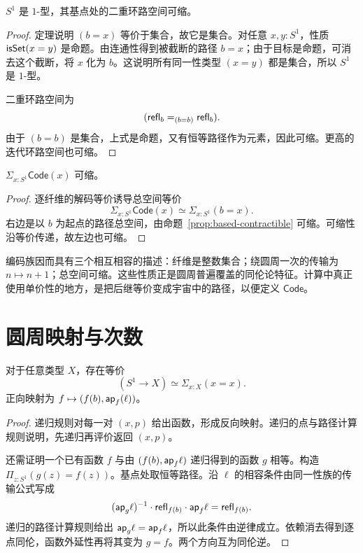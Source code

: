 \begin{proposition}[圆周的高阶路径]
$S^1$ 是 $1$-型，其基点处的二重环路空间可缩。
\end{proposition}
\begin{proof}
定理说明 $(b=x)$ 等价于集合，故它是集合。对任意 $x,y:S^1$，性质 $\mathsf{isSet}(x=y)$ 是命题。由连通性得到被截断的路径 $b=x$；由于目标是命题，可消去这个截断，将 $x$ 化为 $b$。这说明所有同一性类型 $(x=y)$ 都是集合，所以 $S^1$ 是 $1$-型。

二重环路空间为
\[
 (\mathsf{refl}_b=_{(b=b)}\mathsf{refl}_b).
\]
由于 $(b=b)$ 是集合，上式是命题，又有恒等路径作为元素，因此可缩。更高的迭代环路空间也可缩。
\end{proof}

\begin{proposition}[编码族的总空间]
$\Sigma_{x:S^1}\mathsf{Code}(x)$ 可缩。
\end{proposition}
\begin{proof}
逐纤维的解码等价诱导总空间等价
\[
 \Sigma_{x:S^1}\mathsf{Code}(x)
 \simeq
 \Sigma_{x:S^1}(b=x).
\]
右边是以 $b$ 为起点的路径总空间，由命题~\ref{prop:based-contractible} 可缩。可缩性沿等价传递，故左边也可缩。
\end{proof}

\begin{remark}
编码族因而具有三个相互相容的描述：纤维是整数集合；绕圆周一次的传输为 $n\mapsto n+1$；总空间可缩。这些性质正是圆周普遍覆盖的同伦论特征。计算中真正使用单价性的地方，是把后继等价变成宇宙中的路径，以便定义 $\mathsf{Code}$。
\end{remark}

\section{圆周映射与次数}

\begin{theorem}[圆周的映射空间]
对于任意类型 $X$，存在等价
\[
 (S^1\to X)\simeq\Sigma_{x:X}(x=x).
\]
正向映射为 $f\mapsto(f(b),\mathsf{ap}_f(\ell))$。
\end{theorem}
\begin{proof}
递归规则对每一对 $(x,p)$ 给出函数，形成反向映射。递归的点与路径计算规则说明，先递归再评价返回 $(x,p)$。

还需证明一个已有函数 $f$ 与由 $(f(b),\mathsf{ap}_f\ell)$ 递归得到的函数 $g$ 相等。构造 $\Pi_{z:S^1}(g(z)=f(z))$。基点处取恒等路径。沿 $\ell$ 的相容条件由同一性族的传输公式写成
\[
 (\mathsf{ap}_g\ell)^{-1}\cdot\mathsf{refl}_{f(b)}\cdot\mathsf{ap}_f\ell
 =\mathsf{refl}_{f(b)}.
\]
递归的路径计算规则给出 $\mathsf{ap}_g\ell=\mathsf{ap}_f\ell$，所以此条件由逆律成立。依赖消去得到逐点同伦，函数外延性再将其变为 $g=f$。两个方向互为同伦逆。
\end{proof}

